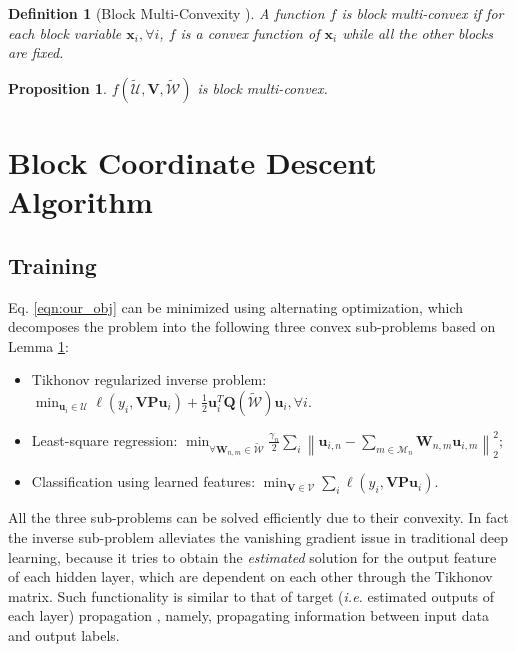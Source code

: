 \documentclass{article}
\def\ie{\emph{i.e. }}
\newtheorem{prop}{Proposition}
\newtheorem{defi}{Definition}
\begin{document}
    \begin{defi}[Block Multi-Convexity \cite{xu2013block}]\label{def:bmc}
    A function $f$ is {\em block multi-convex} if for each block variable $\mathbf{x}_i, \forall i$, $f$ is a convex function of $\mathbf{x}_i$ while all the other blocks are fixed.
    \end{defi}
    
    \begin{prop}\label{lem:multi-convex}
    $f(\tilde{\mathcal{U}}, \mathbf{V}, \tilde{\mathcal{W}})$ is block multi-convex.
    \end{prop}
    
    
    


	
	
	\section{Block Coordinate Descent Algorithm}\label{sec:BCD}
    \subsection{Training}
    
    
    
	
    
		
		
			
			
	
    Eq. \ref{eqn:our_obj} can be minimized using alternating optimization, which decomposes the problem into the following three convex sub-problems based on Lemma \ref{lem:multi-convex}:

        \begin{itemize}
    \item Tikhonov regularized inverse problem: $\min_{\mathbf{u}_i\in\mathcal{U}} \ell(y_i, \mathbf{V}\mathbf{P}\mathbf{u}_{i}) + \frac{1}{2}\mathbf{u}_i^T\mathbf{Q}(\tilde{\mathcal{W}})\mathbf{u}_i, \forall i.$
    \item Least-square regression: $\min_{\forall\mathbf{W}_{n,m}\in\tilde{\mathcal{W}}} \frac{\gamma_n}{2}\sum_{i}\left\|\mathbf{u}_{i,n} - \sum_{m\in\mathcal{M}_n}\mathbf{W}_{n,m}\mathbf{u}_{i,m}\right\|_2^2$;
    \item Classification using learned features: $\min_{\mathbf{V}\in\mathcal{V}} \sum_i \ell(y_i, \mathbf{V}\mathbf{P}\mathbf{u}_{i})$.
    \end{itemize}
        All the three sub-problems can be solved efficiently due to their convexity. In fact the inverse sub-problem alleviates the vanishing gradient issue in traditional deep learning, because it tries to obtain the {\em estimated} solution for the output feature of each hidden layer, which are dependent on each other through the Tikhonov matrix. Such functionality is similar to that of target (\ie estimated outputs of each layer) propagation \cite{bengio2014auto}, namely, propagating information between input data and output labels.
        
\end{document}
